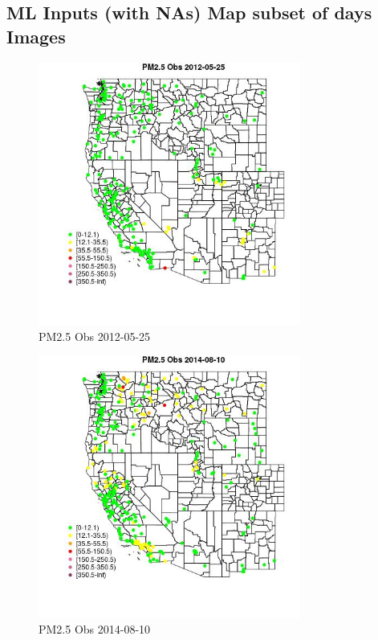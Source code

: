 
\subsection{ML Inputs (with NAs) Map subset of days Images} 
 

\begin{figure} 
\centering  
\includegraphics[width=0.77\textwidth]{Code_Outputs/Report_ML_input_PM25_Step4_part_e_de_duplicated_aves_compiled_2019-05-18wNAs_MapObsPM25_Obs2012-05-25.jpg} 
\caption{\label{fig:Report_ML_input_PM25_Step4_part_e_de_duplicated_aves_compiled_2019-05-18wNAsMapObsPM25_Obs2012-05-25}PM2.5 Obs 2012-05-25} 
\end{figure} 
 

\begin{figure} 
\centering  
\includegraphics[width=0.77\textwidth]{Code_Outputs/Report_ML_input_PM25_Step4_part_e_de_duplicated_aves_compiled_2019-05-18wNAs_MapObsPM25_Obs2014-08-10.jpg} 
\caption{\label{fig:Report_ML_input_PM25_Step4_part_e_de_duplicated_aves_compiled_2019-05-18wNAsMapObsPM25_Obs2014-08-10}PM2.5 Obs 2014-08-10} 
\end{figure} 
 

